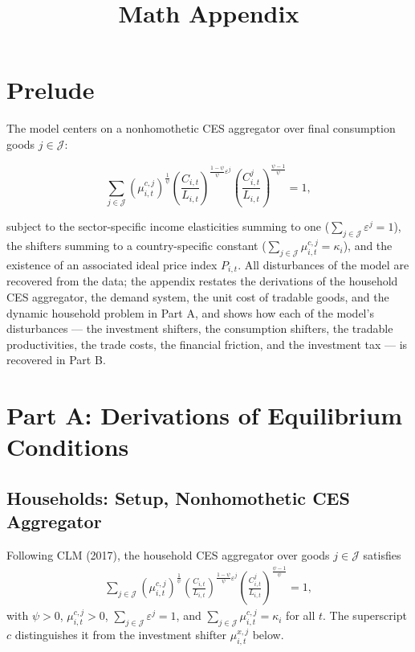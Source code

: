 \documentclass[10pt]{article}
\title{\textbf{Math Appendix}}
\date{}
\begin{document}
\maketitle
\section*{Prelude}

The model centers on a nonhomothetic CES aggregator over final consumption goods
$j \in \mathcal{J}$:

\[
  \sum_{j \in \mathcal{J}}
  \left(\mu^{c,j}_{i,t}\right)^{\frac{1}{\psi}}
  \left( \frac{C_{i,t}}{L_{i,t}} \right)^{\frac{1-\psi}{\psi}\varepsilon^{j}}
  \left( \frac{C^{j}_{i,t}}{L_{i,t}} \right)^{\frac{\psi-1}{\psi}} = 1,
\]

subject to the sector-specific income elasticities summing to one
($\sum_{j \in \mathcal{J}} \varepsilon^{j} = 1$), the shifters summing to a
country-specific constant ($\sum_{j \in \mathcal{J}} \mu^{c,j}_{i,t} = \kappa_i$),
and the existence of an associated ideal price index $P_{i,t}$. All disturbances
of the model are recovered from the data; the appendix restates the derivations
of the household CES aggregator, the demand system, the unit cost of tradable
goods, and the dynamic household problem in Part A, and shows how each of the
model's disturbances --- the investment shifters, the consumption shifters, the
tradable productivities, the trade costs, the financial friction, and the
investment tax --- is recovered in Part B.

\section*{Part A: Derivations of Equilibrium Conditions}
\subsection*{Households: Setup, Nonhomothetic CES Aggregator}
Following CLM (2017), the household CES aggregator over goods $j \in \mathcal{J}$ satisfies
\begin{align}
  \sum_{j \in \mathcal{J}} \left(\mu^{c,j}_{i,t}\right)^{\frac{1}{\psi}}
  \left(\frac{C_{i,t}}{L_{i,t}}\right)^{\frac{1 - \psi}{\psi}\varepsilon^j}
  \left(\frac{C^j_{i,t}}{L_{i,t}}\right)^{\frac{\psi - 1}{\psi}} = 1, \label{eq:aggregator}
\end{align}
with $\psi > 0$, $\mu^{c,j}_{i,t} > 0$, $\sum_{j \in \mathcal{J}} \varepsilon^j = 1$,
and $\sum_{j \in \mathcal{J}}\mu^{c,j}_{i,t} = \kappa_i$ for all $t$. The superscript $c$
distinguishes it from the investment shifter $\mu^{x,j}_{i,t}$ below.
\end{document}
